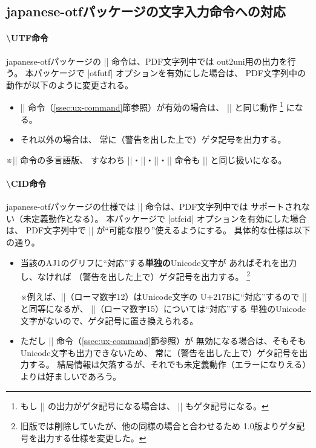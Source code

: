 \documentclass[uplatex,dvipdfmx,a4paper]{jsarticle}
\newcommand{\Pkg}[1]{\textsf{#1}}
\newcommand{\Note}{\par\noindent ※}
\begin{document}
\subsection{\Pkg{japanese-otf}パッケージの文字入力命令への対応}
\label{ssec:otf-package}

\paragraph{\textbackslash UTF命令}
\Pkg{japanese-otf}パッケージの |\UTF| 命令は、PDF文字列中では
out2uni用の出力を行う。
本パッケージで |otfutf| オプションを有効にした場合は、
PDF文字列中の動作が以下のように変更される。

\begin{itemize}
\item |\Ux| 命令（\ref{ssec:ux-command}節参照）が有効の場合は、
  |\Ux| と同じ動作
  \footnote{もし |\Ux| の出力がゲタ記号になる場合は、
    |\UTF| もゲタ記号になる。}%
  になる。
\item それ以外の場合は、
  常に（警告を出した上で）ゲタ記号を出力する。
\end{itemize}

\Note |\UTF| 命令の多言語版、
すなわち |\UTFC|・|\UTFK|・|\UTFM|・|\UTFT| 命令も |\UTF|
と同じ扱いになる。

\paragraph{\textbackslash CID命令}
\Pkg{japanese-otf}パッケージの仕様では |\CID| 命令は、PDF文字列中では
サポートされない（未定義動作となる）。
本パッケージで |otfcid| オプションを有効にした場合は、
PDF文字列中で |\CID| が“可能な限り”使えるようにする。
具体的な仕様は以下の通り。

\begin{itemize}
\item 当該のAJ1のグリフに“対応”する\textbf{単独の}Unicode文字が
  あればそれを出力し、なければ
  （警告を出した上で）ゲタ記号を出力する。
  \footnote{旧版では削除していたが、他の同様の場合と合わせるため
    1.0版よりゲタ記号を出力する仕様を変更した。}
  \Note 例えば、||（ローマ数字12）はUnicode文字の
  U+217Bに“対応”するので || と同等になるが、
  ||（ローマ数字15）については“対応”する
  単独のUnicode文字がないので、ゲタ記号に置き換えられる。
\item ただし |\Ux| 命令（\ref{ssec:ux-command}節参照）が
  無効になる場合は、そもそもUnicode文字も出力できないため、
  常に（警告を出した上で）ゲタ記号を出力する。
  結局情報は欠落するが、それでも未定義動作（エラーになりえる）
  よりは好ましいであろう。
\end{itemize}
\end{document}
